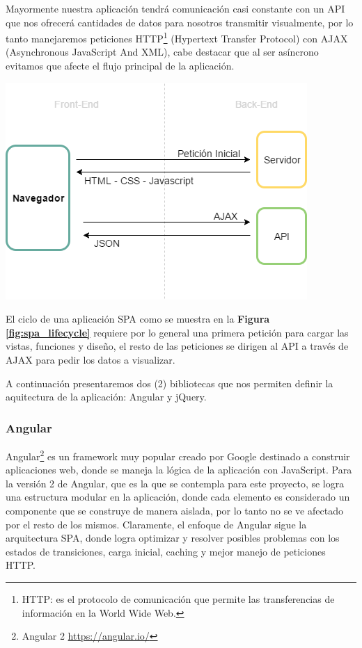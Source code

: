 Mayormente nuestra aplicación tendrá comunicación casi constante con un API que nos ofrecerá cantidades de datos para nosotros transmitir visualmente, por lo tanto manejaremos peticiones HTTP\footnote{HTTP: es el protocolo de comunicación que permite las transferencias de información en la World Wide Web.} (Hypertext Transfer Protocol) con AJAX \cite{AJAX} (Asynchronous JavaScript And XML), cabe destacar que al ser asíncrono evitamos que afecte el flujo principal de la aplicación.
\begin{center}
\includegraphics[scale=0.6]{images/marco_tecnologico/spa_lifecycle.png}
\label{fig:spa_lifecycle}
\end{center}
El ciclo de una aplicación SPA como se muestra en la \textbf{Figura \ref{fig:spa_lifecycle}} requiere por lo general una primera petición para cargar las vistas, funciones y diseño, el resto de las peticiones se dirigen al API a través de AJAX para pedir los datos a visualizar.

A continuación presentaremos dos (2) bibliotecas que nos permiten definir la aquitectura de la aplicación: Angular y jQuery.

\subsubsection{Angular}
Angular\footnote{Angular 2 \url{https://angular.io/}} es un framework muy popular creado por Google destinado a construir aplicaciones web, donde se maneja la lógica de la aplicación con \mbox{JavaScript}. Para la versión 2 de Angular, que es la que se contempla para este proyecto, se logra una estructura modular en la aplicación, donde cada elemento es considerado un componente que se construye de manera aislada, por lo tanto no se ve afectado por el resto de los mismos. Claramente, el enfoque de Angular sigue la arquitectura SPA, donde logra optimizar y resolver posibles problemas con los estados de transiciones, carga inicial, caching y mejor manejo de peticiones HTTP.

